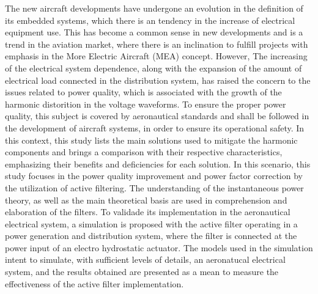 The new aircraft developments have undergone an evolution in the definition of its embedded systems, which there is an tendency in the increase of electrical equipment use. This has become a common sense in new developments and is a trend in the aviation market, where there is an inclination to fulfill projects with emphasis in the More Electric Aircraft (MEA) concept. However, The increasing of the electrical system dependence, along with the expansion of the amount of electrical load connected in the distribution system, has raised the concern to the issues related to power quality, which is associated with the growth of the harmonic distorition in the voltage waveforms. To ensure the proper power quality, this subject is covered by aeronautical standards and shall be followed in the development of aircraft systems, in order to ensure its operational safety. In this context, this study lists the main solutions used to mitigate the harmonic components and brings a comparison with their respective characteristics, emphasizing their benefits and deficiencies for each solution. In this scenario, this study focuses in the power quality improvement and power factor correction by the utilization of active filtering. The understanding of the instantaneous power theory, as well as the main theoretical basis are used in comprehension and elaboration of the filters. To validade its implementation in the aeronautical electrical system, a simulation is proposed with the active filter operating in a power generation and distribution system, where the filter is connected at the power input of an electro hydrostatic actuator. The models used in the simulation intent to simulate, with sufficient levels of details, an aeronatucal electrical system, and the results obtained are presented as a mean to measure the effectiveness of the active filter implementation.